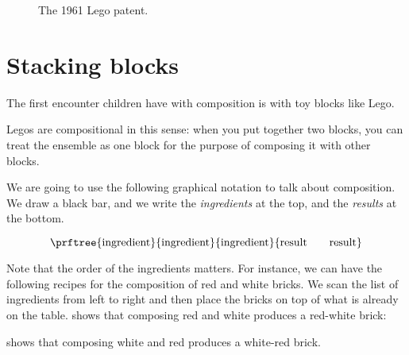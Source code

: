 \begin{figure*}[p]
    \centering
%
    \caption{The 1961 Lego patent.}
\end{figure*}

\section{Stacking blocks}





The first encounter children have with composition is with toy blocks like Lego.

Legos are compositional in this sense: when you put together two blocks, you can treat the ensemble as one block for the purpose of composing it with other blocks.

We are going to use the following graphical notation to talk about composition.
We draw a black bar, and we write the \emph{ingredients} at the top, and the \emph{results} at the bottom.

\begin{equation}
    \prftree{
        \text{ingredient}
    }{
        \text{ingredient}
    }{
        \text{ingredient}
    }{
        \text{result} \quad \quad \text{result}
    }
\end{equation}

Note that the order of the ingredients matters.
For instance, we can have the following recipes for the composition of red and white bricks.
We scan the list of ingredients from left to right and then place the bricks on top of what is already on the table.
 shows that composing red and white produces a red-white brick:
 
% 
 shows that composing white and red produces a white-red brick.


